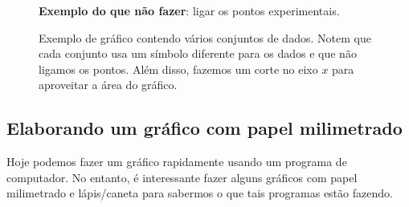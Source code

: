 \begin{figure*}
\centering
\forcerectofloat

\caption{\textbf{Exemplo do que não fazer}: ligar os pontos experimentais.}
\label{GraficoErrado}
\end{figure*}

\begin{figure*}
\centering
\forcerectofloat
\label{ExemploGrafico}

\caption{Exemplo de gráfico contendo vários conjuntos de dados. Notem que cada conjunto usa um símbolo diferente para os dados e que não ligamos os pontos. Além disso, fazemos um corte no eixo $x$ para aproveitar a área do gráfico.}
\end{figure*}

\subsection{Elaborando um gráfico com papel milimetrado}

Hoje podemos fazer um gráfico rapidamente usando um programa de computador. No entanto, é interessante fazer alguns gráficos com papel milimetrado e lápis/caneta para sabermos o que tais programas estão fazendo.

